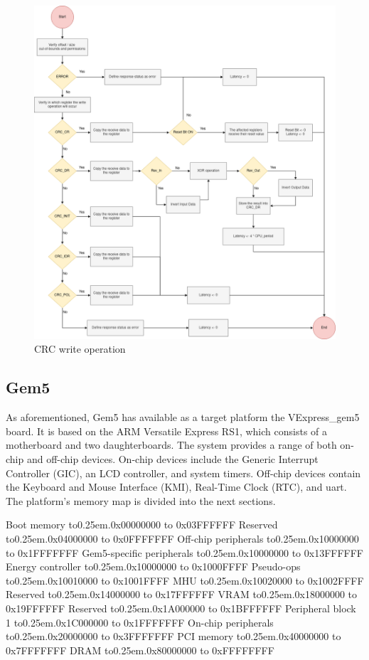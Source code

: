 \begin{figure}[t!]
	\centering
 	\includegraphics[width=0.7\linewidth]{Images/CRC_write.png}
 	\caption{CRC write operation}
	 \label{fig_CRC_write}
\end{figure}


\subsection{Gem5}

As aforementioned, Gem5 has available as a target platform the VExpress\_gem5 board. It is based on the ARM Versatile Express RS1, which 
consists of a motherboard and two daughterboards. The system provides a range of both on-chip and off-chip devices.
On-chip devices include the Generic Interrupt Controller (GIC), an LCD controller, and system timers.
Off-chip devices contain the Keyboard and Mouse Interface (KMI), Real-Time Clock (RTC), and \gls{uart}. 
The platform's memory map is divided into the next sections.

\def\mydots{\xleaders\hbox to0.25em{\hfill.\hfill}\hfill}

\begin{outline}[enumerate]
	\1 Boot memory 						\mydots 	0x00000000 to 0x03FFFFFF
	\1 Reserved							\mydots 	0x04000000 to 0x0FFFFFFF
	\1 Off-chip peripherals				\mydots 	0x10000000 to 0x1FFFFFFF
		\2 Gem5-specific peripherals	\mydots 	0x10000000 to 0x13FFFFFF
			\3 Energy controller 		\mydots 	0x10000000 to 0x1000FFFF
			\3 Pseudo-ops				\mydots		0x10010000 to 0x1001FFFF
			\3 MHU						\mydots		0x10020000 to 0x1002FFFF
		\2 Reserved 					\mydots 	0x14000000 to 0x17FFFFFF
		\2 VRAM							\mydots		0x18000000 to 0x19FFFFFF
		\2 Reserved 					\mydots		0x1A000000 to 0x1BFFFFFF
		\2 Peripheral block 1			\mydots		0x1C000000 to 0x1FFFFFFF
	\1 On-chip  peripherals				\mydots 	0x20000000 to 0x3FFFFFFF
	\1 PCI memory 						\mydots 	0x40000000 to 0x7FFFFFFF
	\1 DRAM								\mydots 	0x80000000 to 0xFFFFFFFF
\end{outline}

